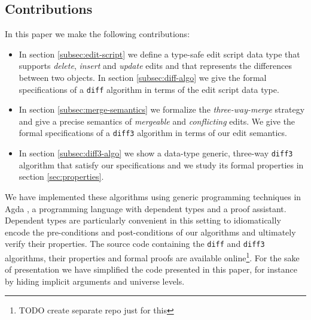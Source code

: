 \documentclass[preprint]{sigplanconf}
\begin{document}

\subsection{Contributions}
In this paper we make the following contributions:
\begin{itemize}
\item In section \ref{subsec:edit-script} we define a type-safe edit script data 
      type that supports \emph{delete}, \emph{insert} and \emph{update} edits and 
      that represents the differences between two objects. In section 
      \ref{subsec:diff-algo} we give the formal specifications of a \texttt{diff} 
      algorithm in terms of the edit script data type.
\item In section \ref{subsec:merge-semantics} we formalize the 
      \emph{three-way-merge} strategy and give a precise semantics of 
      \emph{mergeable} and \emph{conflicting} edits. We give 
      the formal specifications of a \texttt{diff3} algorithm in terms of our edit 
      semantics. 
\item In section \ref{subsec:diff3-algo} we show a data-type generic, three-way 
      \texttt{diff3} algorithm that satisfy our specifications and we study its 
      formal properties in section \ref{sec:properties}.
\end{itemize}
We have implemented these algorithms using generic programming techniques in Agda \cite{agda}, a programming language with dependent types and a proof assistant. 
Dependent types are particularly convenient in this setting to idiomatically encode the pre-conditions and post-conditions of our algorithms and ultimately verify their properties.
The source code containing the \texttt{diff} and \texttt{diff3} algorithms, their properties and formal proofs are available online\footnote{TODO create separate repo just for this}. 
For the sake of presentation we have simplified the code presented in this paper, for instance by 
hiding implicit arguments and universe levels.
\end{document}
